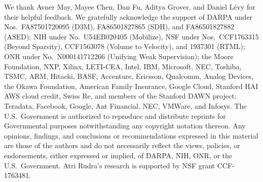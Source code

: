 \documentclass{article} %
\begin{document}
We thank
Avner May, Mayee Chen, Dan Fu,
Aditya Grover,
and Daniel L\'{e}vy
for their helpful feedback.
We gratefully acknowledge the support of DARPA under Nos.\ FA87501720095 (D3M),
FA86501827865 (SDH), and FA86501827882 (ASED); NIH under No.\ U54EB020405
(Mobilize), NSF under Nos.\ CCF1763315 (Beyond Sparsity), CCF1563078 (Volume to
Velocity), and 1937301 (RTML); ONR under No.\ N000141712266 (Unifying Weak
Supervision); the Moore Foundation, NXP, Xilinx, LETI-CEA, Intel, IBM,
Microsoft, NEC, Toshiba, TSMC, ARM, Hitachi, BASF, Accenture, Ericsson,
Qualcomm, Analog Devices, the Okawa Foundation, American Family Insurance,
Google Cloud, Stanford HAI AWS cloud credit, Swiss Re, and members of the Stanford DAWN project: Teradata,
Facebook, Google, Ant Financial, NEC, VMWare, and Infosys.
The U.S.\ Government is authorized to reproduce and distribute reprints for
Governmental purposes notwithstanding any copyright notation thereon.
Any opinions, findings, and conclusions or recommendations expressed in this
material are those of the authors and do not necessarily reflect the views,
policies, or endorsements, either expressed or implied, of DARPA, NIH, ONR, or
the U.S.\ Government.
Atri Rudra’s research is supported by NSF grant CCF-1763481.





\appendix

\newpage













\end{document}
